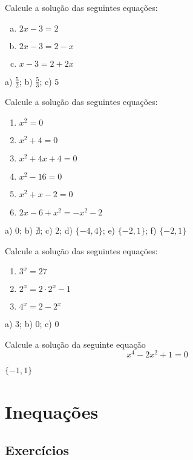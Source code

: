 \begin{exer}
  Calcule a solução das seguintes equações:
  \begin{enumerate}[a)]
  \item $2x - 3 = 2$
  \item $2x - 3 = 2 - x$
  \item $x - 3 = 2 + 2x$
  \end{enumerate}
\end{exer}
\begin{resp}
  a) $\frac{5}{2}$; b) $\frac{5}{3}$; c) $5$
\end{resp}

\begin{exer}
  Calcule a solução das seguintes equações:
  \begin{enumerate}
  \item $x^2 = 0$
  \item $x^2 + 4 = 0$
  \item $x^2 + 4x + 4 = 0$
  \item $x^2 - 16 = 0$
  \item $x^2 + x - 2 = 0$
  \item $2x - 6 + x^2 = -x^2 - 2$
  \end{enumerate}
\end{exer}
\begin{resp}
  a) $0$; b) $\nexists$; c) $2$; d) $\{-4,4\}$; e) $\{-2,1\}$; f) $\{-2,1\}$ 
\end{resp}

\begin{exer}
  Calcule a solução das seguintes equações:
  \begin{enumerate}
  \item $3^x = 27$
  \item $2^x = 2\cdot 2^x - 1$
  \item $4^x = 2 - 2^x$
  \end{enumerate}
\end{exer}
\begin{resp}
 a) $3$; b) $0$; c) $0$
\end{resp}

\begin{exer}
  Calcule a solução da seguinte equação
  \begin{equation}
    x^4 - 2x^2 + 1 = 0
  \end{equation}
\end{exer}
\begin{resp}
  $\{-1,1\}$
\end{resp}

\section*{Inequações}\label{cap_ineq_sec_ineq}

\emconstrucao

\subsection*{Exercícios}

\emconstrucao
